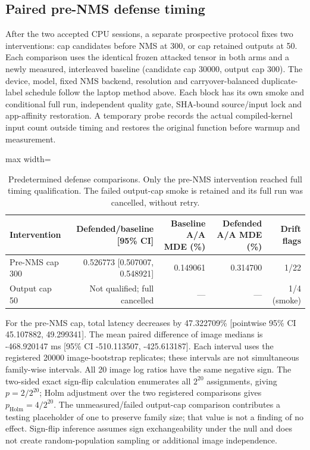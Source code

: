 \subsection{Paired pre-NMS defense timing}
\label{app:seg-laptop-defense}
After the two accepted CPU sessions, a separate prospective protocol fixes two interventions: cap candidates before NMS at 300, or cap retained outputs at 50. Each comparison uses the identical frozen attacked tensor in both arms and a newly measured, interleaved baseline (candidate cap 30000, output cap 300). The device, model, fixed NMS backend, resolution and carryover-balanced duplicate-label schedule follow the laptop method above. Each block has its own smoke and conditional full run, independent quality gate, SHA-bound source/input lock and app-affinity restoration. A temporary probe records the actual compiled-kernel input count outside timing and restores the original function before warmup and measurement.
\begin{table}[t]\centering
\caption{Predetermined defense comparisons. Only the pre-NMS intervention reached full timing qualification. The failed output-cap smoke is retained and its full run was cancelled, without retry.}
\label{tab:seg-laptop-defense}
\begin{adjustbox}{max width=\textwidth}\begin{tabular}{lrrrr}\toprule
Intervention & Defended/baseline [95\% CI] & Baseline A/A MDE (\%) & Defended A/A MDE (\%) & Drift flags\\\midrule
Pre-NMS cap 300 & 0.526773 [0.507007, 0.548921] & 0.149061 & 0.314700 & 1/22 \\
Output cap 50 & Not qualified; full cancelled & --- & --- & 1/4 (smoke) \\
\bottomrule\end{tabular}\end{adjustbox}\end{table}
For the pre-NMS cap, total latency decreases by 47.322709\% [pointwise 95\% CI 45.107882, 49.299341]. The mean paired difference of image medians is -468.920147 ms [95\% CI -510.113507, -425.613187]. Each interval uses the registered 20000 image-bootstrap replicates; these intervals are not simultaneous family-wise intervals.
All 20 image log ratios have the same negative sign. The two-sided exact sign-flip calculation enumerates all $2^{20}$ assignments, giving $p=2/2^{20}$; Holm adjustment over the two registered comparisons gives $p_{\mathrm{Holm}}=4/2^{20}$. The unmeasured/failed output-cap comparison contributes a testing placeholder of one to preserve family size; that value is not a finding of no effect. Sign-flip inference assumes sign exchangeability under the null and does not create random-population sampling or additional image independence.
